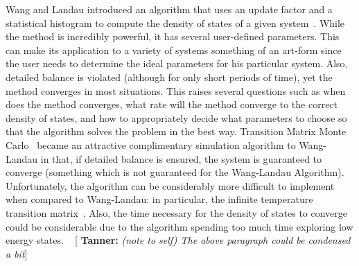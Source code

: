 \documentclass[letterpaper,twocolumn,amsmath,amssymb,pre,aps,10pt]{revtex4-1}
\newcommand{\cyan}[1]{{\bf \color{cyan} #1}}
\newcommand{\tssays}[1]{{\color{red} [\cyan{Tanner:} \emph{#1}]}}
\begin{document}
Wang and Landau introduced an algorithm that uses an update
factor and a statistical histogram to compute the density of states of
a given system~\cite{wang2001determining, wang2001efficient}.  While
the method is incredibly powerful, it has several user-defined
parameters.  This can make its application to a variety of systems
something of an art-form since the user needs to determine the ideal
parameters for his particular system.  Also, detailed balance is
violated (although for only short periods of time), yet the method
converges in most situations.  This raises several questions such as
when does the method converges, what rate will the method converge to
the correct density of states, and how to appropriately decide what
parameters to choose so that the algorithm solves the problem in the
best way. Transition Matrix Monte Carlo~\cite{wang1999transition,
swendsen1999transition, fitzgerald2000monte} became an attractive
complimentary simulation algorithm to Wang-Landau in that, if detailed
balance is ensured, the system is guaranteed to converge (something
which is not guaranteed for the Wang-Landau Algorithm).  Unfortunately,
the algorithm can be considerably more difficult to implement when
compared to Wang-Landau: in particular, the infinite temperature
transition matrix~\cite{wang2002transition}.  Also, the time necessary
for the density of states to converge could be considerable
due to the algorithm spending too much time exploring low energy states.
~\tssays{(note to self) The above paragraph could be condensed a bit}
\end{document}
